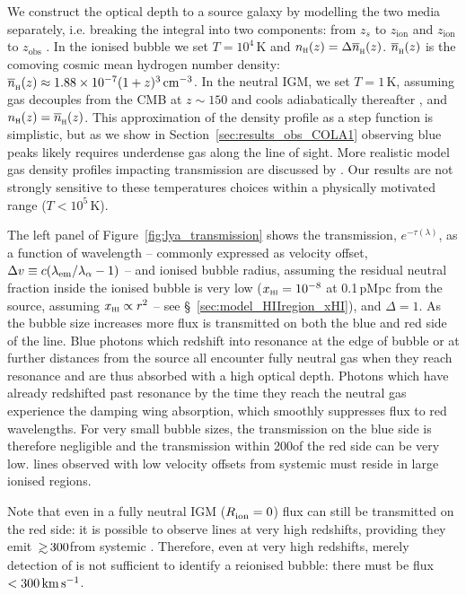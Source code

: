\documentclass[fleqn,usenatbib]{mnras}
\begin{document}
We construct the optical depth to a source galaxy by modelling the two media separately, i.e. breaking the integral into two components: from $z_s$ to $z_\textrm{ion}$ and $z_\textrm{ion}$ to $z_\mathrm{obs}$ \citep[following,][]{Haiman2002,Cen2000,Mesinger2004}. In the ionised bubble we set $T=10^4$\,K \citep[appropriate for photoionised gas at the mean density, e.g.,][]{Hui1997} and $n_\textsc{h}(z) = \Delta \nh(z)$. $\nh(z)$ is the comoving cosmic mean hydrogen number density: $\nh(z) \approx 1.88\times10^{-7} (1+z)^3\cm^{-3}$. In the neutral IGM, we set $T=1$\,K, assuming gas decouples from the CMB at $z\sim150$ and cools adiabatically thereafter \citep{Peebles1993}, and $n_\textsc{h}(z) = \nh(z)$. This approximation of the density profile as a step function is simplistic, but as we show in Section~\ref{sec:results_obs_COLA1} observing blue peaks likely requires underdense gas along the line of sight. More realistic model gas density profiles impacting \lya transmission are discussed by \citet{Santos2004}. Our results are not strongly sensitive to these temperatures choices within a physically motivated range ($T<10^5$\,K).

The left panel of Figure~\ref{fig:lya_transmission} shows the \lya transmission, $e^{-\tau(\lambda)}$, as a function of wavelength -- commonly expressed as velocity offset, $\DV \equiv c (\lambda_\mathrm{em} / \lambda_\alpha - 1)$ -- and ionised bubble radius, assuming the residual neutral fraction inside the ionised bubble is very low ($\xHI = 10^{-8}$ at 0.1\,pMpc from the source, assuming $\xHI \propto r^2$ -- see \S~\ref{sec:model_HIIregion_xHI}), and $\Delta=1$. As the bubble size increases more flux is transmitted on both the blue and red side of the line. Blue photons which redshift into resonance at the edge of bubble or at further distances from the source all encounter fully neutral gas when they reach resonance and are thus absorbed with a high optical depth. Photons which have already redshifted past resonance by the time they reach the neutral gas experience the damping wing absorption, which smoothly suppresses flux to red wavelengths. For very small bubble sizes, the transmission on the blue side is therefore negligible and the transmission within 200\kms of the red side can be very low. \lya lines observed with low velocity offsets from systemic must reside in large ionised regions. 

Note that even in a fully neutral IGM ($\Rion = 0$) \lya flux can still be transmitted on the red side: it is possible to observe \lya lines at very high redshifts, providing they emit \lya $\simgt300$\kms from systemic \citep{Dijkstra2011}. Therefore, even at very high redshifts, merely detection of \lya is not sufficient to identify a reionised bubble: there must be flux $<300\kms$.
\end{document}
